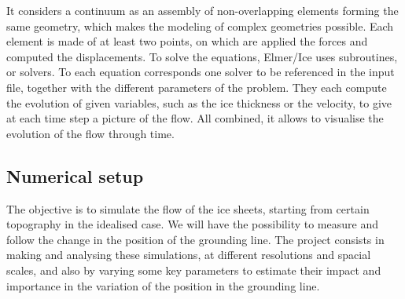 \documentclass[a4paper,12pt]{article}
\begin{document}
It considers a continuum as an assembly of non-overlapping elements forming the same geometry, which makes the modeling of complex geometries possible. Each element is made of at least two points, on which are applied the forces and computed the displacements. To solve the equations, Elmer/Ice uses subroutines, or solvers. To each equation corresponds one solver to be referenced in the input file, together with the different parameters of the problem. They each compute the evolution of given variables, such as the ice thickness or the velocity, to give at each time step a picture of the flow. All combined, it allows to visualise the evolution of the flow through time.
\subsection{Numerical setup}
The objective is to simulate the flow of the ice sheets, starting from certain topography in the idealised case. We will have the possibility to measure and follow the change in the position of the grounding line. The project consists in making and analysing these simulations, at different resolutions and spacial scales, and also by varying some key parameters to estimate their impact and importance in the variation of the position in the grounding line. 
\end{document}

